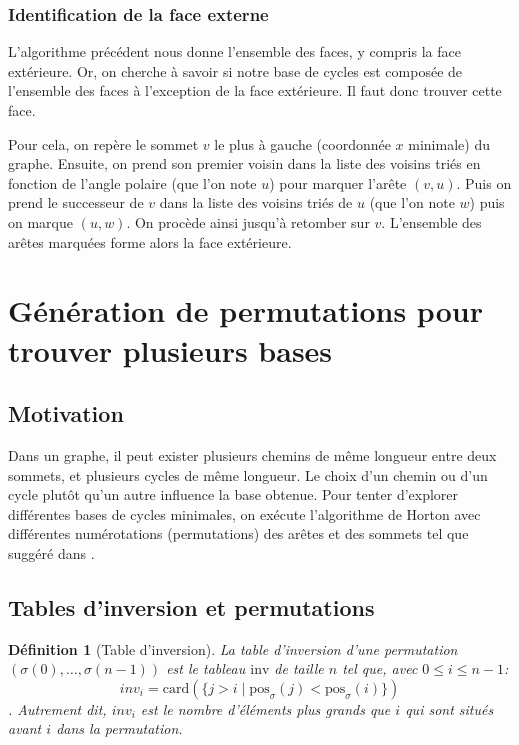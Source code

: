 \documentclass{article}
\newtheorem{definition}[theorem]{Définition}
\begin{document}
\subsubsection{Identification de la face externe}

L’algorithme précédent nous donne l'ensemble des faces, y compris la face extérieure. Or, on cherche à savoir si notre base de cycles est composée de l'ensemble des faces à l'exception de la face extérieure. Il faut donc trouver cette face.

Pour cela, on repère le sommet $v$ le plus à gauche (coordonnée $x$ minimale) du graphe. Ensuite, on prend son premier voisin dans la liste des voisins triés en fonction de l'angle polaire (que l'on note $u$) pour marquer l'arête $(v,u)$. Puis on prend le successeur de $v$ dans la liste des voisins triés de $u$ (que l'on note $w$) puis on marque $(u,w)$. On procède ainsi jusqu'à retomber sur $v$. L'ensemble des arêtes marquées forme alors la face extérieure.

\section{Génération de permutations pour trouver plusieurs bases}

\subsection{Motivation}

Dans un graphe, il peut exister plusieurs chemins de même longueur entre deux sommets, et plusieurs cycles de même longueur. Le choix d'un chemin ou d'un cycle plutôt qu'un autre influence la base obtenue. Pour tenter d'explorer différentes bases de cycles minimales, on exécute l'algorithme de Horton avec différentes numérotations (permutations) des arêtes et des sommets tel que suggéré dans \cite{Vismara1997}.

\subsection{Tables d'inversion et permutations}

\begin{definition}[Table d'inversion]
La table d'inversion d'une permutation $(\sigma(0),\ldots,\sigma(n-1))$ est le tableau $\text{inv}$ de taille $n$ tel que, avec $0 \leq i \leq n-1 $: \[ inv_i = \text{card}(\{ j > i \mid \text{pos}_\sigma(j) < \text{pos}_\sigma(i) \}) \]. Autrement dit, $inv_i$ est le nombre d'éléments plus grands que $i$ qui sont situés avant $i$ dans la permutation.
\end{definition}
\end{document}
